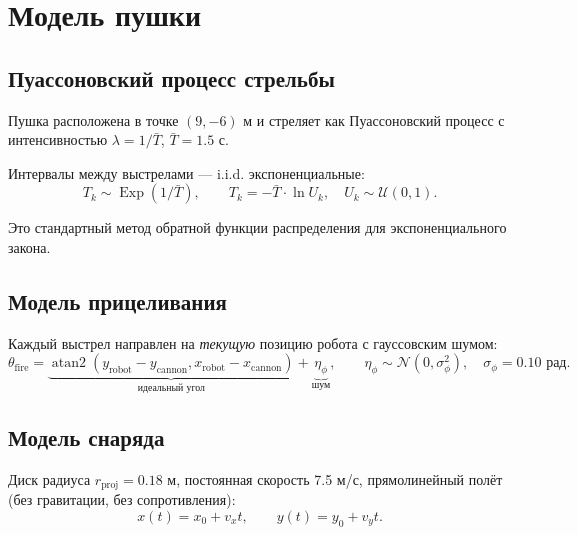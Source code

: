 \documentclass[12pt, a4paper]{article}
\newcommand{\atantwo}{\operatorname{atan2}}
\theoremstyle{definition}
\theoremstyle{plain}
\begin{document}
\section{Модель пушки}\label{sec:cannon}

\subsection{Пуассоновский процесс стрельбы}

Пушка расположена в точке $(9, -6)$ м и стреляет как Пуассоновский процесс
с интенсивностью $\lambda = 1/\bar{T}$, $\bar{T} = 1.5$ с.

Интервалы между выстрелами --- i.i.d. экспоненциальные:
\begin{equation}
  T_k \sim \operatorname{Exp}(1/\bar{T}), \qquad
  T_k = -\bar{T} \cdot \ln U_k, \quad U_k \sim \mathcal{U}(0, 1).
\end{equation}

Это стандартный метод обратной функции распределения для экспоненциального
закона.

\subsection{Модель прицеливания}

Каждый выстрел направлен на \emph{текущую} позицию робота с гауссовским шумом:
\begin{equation}
  \theta_{\text{fire}} = \underbrace{\atantwo(y_{\text{robot}} - y_{\text{cannon}},
                                     x_{\text{robot}} - x_{\text{cannon}})}_{\text{идеальный угол}}
                       + \underbrace{\eta_\phi}_{\text{шум}}, \qquad
  \eta_\phi \sim \mathcal{N}(0, \sigma_\phi^2), \quad \sigma_\phi = 0.10 \text{ рад}.
\end{equation}

\subsection{Модель снаряда}

Диск радиуса $r_{\text{proj}} = 0.18$ м, постоянная скорость 7.5 м/с,
прямолинейный полёт (без гравитации, без сопротивления):
\begin{equation}
  x(t) = x_0 + v_x t, \qquad y(t) = y_0 + v_y t.
\end{equation}
\end{document}

